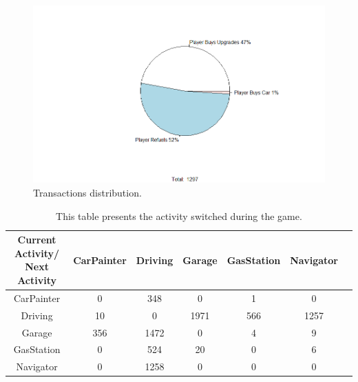 \documentclass[preprint,authoryear,12pt]{elsarticle}
\begin{document}
\begin{figure}[htb]
	\begin{center}
		\includegraphics[width=.95\linewidth]{ijhcs14-img/transactions_all}
		\caption{Transactions distribution.\label{fig:4diagrams_transactions}}
	\end{center}
\end{figure}

\begin{table}[!htb]
	\renewcommand*{\arraystretch}{1.4}
	\caption{This table presents the activity switched during the game.}
	\begin{center}
		\begin{tabular}{c|c|c|c|c|c|c}
			Current Activity/ Next Activity & CarPainter & Driving & Garage & GasStation &  Navigator\\
			\hline
			CarPainter & 0&	348&	0&	1&	0\\
			
			Driving & 10&	0&	1971&	566&	1257\\
			
			Garage& 356&	1472&	0&	4&	9\\
			
			GasStation& 0&	524&	20&	0&	6\\
			
			Navigator& 0&	1258&	0&	0&	0\\
			
			
		\end{tabular}
	\end{center}
	\label{T:Activityswitch_all}
\end{table}
\end{document}
